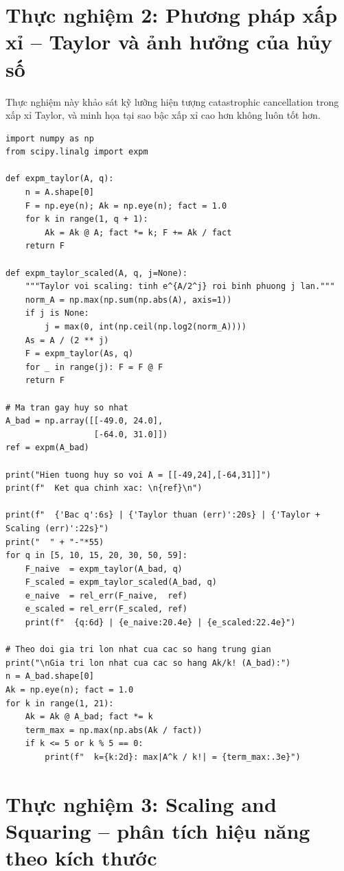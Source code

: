 \documentclass[12pt,a4paper]{report}
\begin{document}
\section{Thực nghiệm 2: Phương pháp xấp xỉ -- Taylor và ảnh hưởng của hủy số}

Thực nghiệm này khảo sát kỹ lưỡng hiện tượng catastrophic cancellation trong
xấp xỉ Taylor, và minh họa tại sao bậc xấp xỉ cao hơn không luôn tốt hơn.

\begin{lstlisting}[style=python, caption={Thực nghiệm 2: hiện tượng hủy số trong Taylor và vai trò của scaling}]
import numpy as np
from scipy.linalg import expm

def expm_taylor(A, q):
    n = A.shape[0]
    F = np.eye(n); Ak = np.eye(n); fact = 1.0
    for k in range(1, q + 1):
        Ak = Ak @ A; fact *= k; F += Ak / fact
    return F

def expm_taylor_scaled(A, q, j=None):
    """Taylor voi scaling: tinh e^{A/2^j} roi binh phuong j lan."""
    norm_A = np.max(np.sum(np.abs(A), axis=1))
    if j is None:
        j = max(0, int(np.ceil(np.log2(norm_A))))
    As = A / (2 ** j)
    F = expm_taylor(As, q)
    for _ in range(j): F = F @ F
    return F

# Ma tran gay huy so nhat
A_bad = np.array([[-49.0, 24.0],
                  [-64.0, 31.0]])
ref = expm(A_bad)

print("Hien tuong huy so voi A = [[-49,24],[-64,31]]")
print(f"  Ket qua chinh xac: \n{ref}\n")

print(f"  {'Bac q':6s} | {'Taylor thuan (err)':20s} | {'Taylor + Scaling (err)':22s}")
print("  " + "-"*55)
for q in [5, 10, 15, 20, 30, 50, 59]:
    F_naive  = expm_taylor(A_bad, q)
    F_scaled = expm_taylor_scaled(A_bad, q)
    e_naive  = rel_err(F_naive,  ref)
    e_scaled = rel_err(F_scaled, ref)
    print(f"  {q:6d} | {e_naive:20.4e} | {e_scaled:22.4e}")

# Theo doi gia tri lon nhat cua cac so hang trung gian
print("\nGia tri lon nhat cua cac so hang Ak/k! (A_bad):")
n = A_bad.shape[0]
Ak = np.eye(n); fact = 1.0
for k in range(1, 21):
    Ak = Ak @ A_bad; fact *= k
    term_max = np.max(np.abs(Ak / fact))
    if k <= 5 or k % 5 == 0:
        print(f"  k={k:2d}: max|A^k / k!| = {term_max:.3e}")
\end{lstlisting}

\section{Thực nghiệm 3: Scaling and Squaring -- phân tích hiệu năng theo kích thước}
\end{document}
